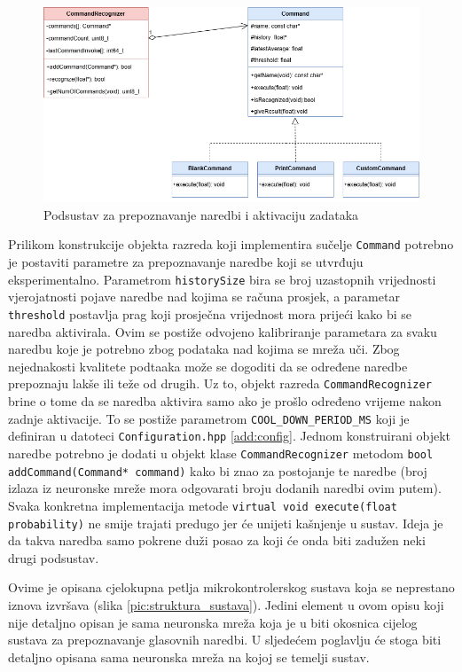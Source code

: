 \begin{figure}[htb]
    \centering
    \includegraphics[width=0.9\linewidth]{Chapters/struktura_sustava/prepoznavanje_naredbi/commands.png} 
    \caption{Podsustav za prepoznavanje naredbi i aktivaciju zadataka\cite{flowchart}}
    \label{pic:uml}
\end{figure}

Prilikom konstrukcije objekta razreda koji implementira sučelje \texttt{Command} potrebno je postaviti
parametre za prepoznavanje naredbe koji se utvrđuju eksperimentalno. Parametrom \texttt{historySize}
bira se broj uzastopnih vrijednosti vjerojatnosti pojave naredbe nad kojima se računa prosjek,
a parametar \texttt{threshold} postavlja prag koji prosječna vrijednost mora prijeći kako bi se naredba
aktivirala. Ovim se postiže odvojeno kalibriranje parametara za svaku naredbu koje je potrebno
zbog podataka nad kojima se mreža uči. Zbog nejednakosti kvalitete podtaaka može se dogoditi da se određene
naredbe prepoznaju lakše ili teže od drugih.
Uz to, objekt razreda \texttt{CommandRecognizer} brine o tome da se naredba aktivira
samo ako je prošlo određeno vrijeme nakon zadnje aktivacije. To se postiže parametrom 
\texttt{COOL\_DOWN\_PERIOD\_MS} koji je definiran u datoteci \texttt{Configuration.hpp} \ref{add:config}.
Jednom konstruirani objekt naredbe potrebno je dodati 
u objekt klase \texttt{CommandRecognizer} metodom \texttt{bool addCommand(Command* command)} 
kako bi znao za postojanje te naredbe (broj izlaza iz neuronske mreže mora odgovarati 
broju dodanih naredbi ovim putem). Svaka konkretna implementacija metode 
\texttt{virtual void execute(float probability)} ne smije trajati predugo jer će unijeti 
kašnjenje u sustav. Ideja je da takva naredba samo pokrene duži posao za koji će onda
biti zadužen neki drugi podsustav.

Ovime je opisana cjelokupna petlja mikrokontrolerskog sustava
koja se neprestano iznova izvršava (slika \ref{pic:struktura_sustava}).
Jedini element u ovom opisu koji nije detaljno opisan je sama neuronska mreža koja
je u biti okosnica cijelog sustava za prepoznavanje glasovnih naredbi. 
U sljedećem poglavlju će stoga biti detaljno opisana sama neuronska mreža na kojoj se temelji sustav.